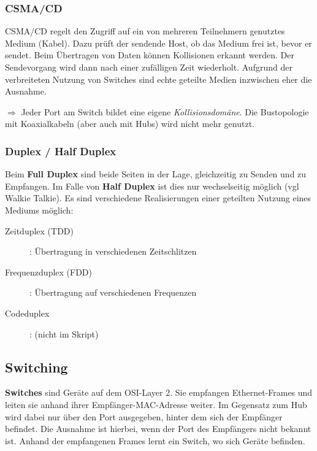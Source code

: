 \documentclass{article} %
\begin{document}
\subsubsection{CSMA/CD}

CSMA/CD regelt den Zugriff auf ein von mehreren Teilnehmern genutztes Medium (Kabel).
Dazu prüft der sendende Host, ob das Medium frei ist, bevor er sendet.
Beim Übertragen von Daten können Kollisionen erkannt werden.
Der Sendevorgang wird dann nach einer zufälligen Zeit wiederholt.
Aufgrund der verbreiteten Nutzung von Switches sind echte geteilte Medien inzwischen eher die Ausnahme.

$\Rightarrow$ Jeder Port am Switch bildet eine eigene \emph{Kollisionsdomäne}.
Die Bustopologie mit Koaxialkabeln (aber auch mit Hubs) wird nicht mehr genutzt.

\subsubsection{Duplex / Half Duplex}

Beim \textbf{Full Duplex} sind beide Seiten in der Lage, gleichzeitig zu Senden und zu Empfangen.
Im Falle von \textbf{Half Duplex} ist dies nur wechselseitig möglich (vgl Walkie Talkie).
Es sind verschiedene Realisierungen einer geteilten Nutzung eines Mediums möglich:

\begin{description}
	\item [Zeitduplex (TDD)]: Übertragung in verschiedenen Zeitschlitzen
	\item [Frequenzduplex (FDD)]: Übertragung auf verschiedenen Frequenzen
	\item [Codeduplex]: (nicht im Skript)
\end{description}

\subsection{Switching}

\textbf{Switches} sind Geräte auf dem OSI-Layer 2.
Sie empfangen Ethernet-Frames und leiten sie anhand ihrer Empfänger-MAC-Adresse weiter.
Im Gegensatz zum Hub wird dabei nur über den Port ausgegeben, hinter dem sich der Empfänger befindet.
Die Ausnahme ist hierbei, wenn der Port des Empfängers nicht bekannt ist.
Anhand der empfangenen Frames lernt ein Switch, wo sich Geräte befinden.
\end{document}

